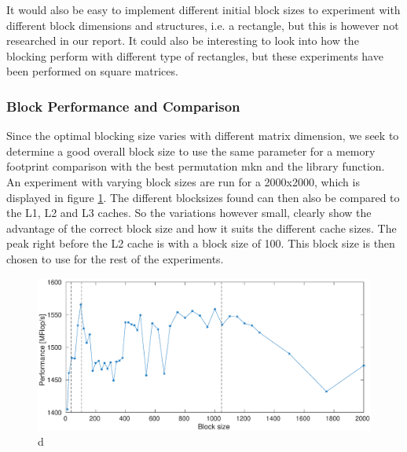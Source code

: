 It would also be easy to implement different initial block sizes to experiment with different block dimensions and structures, i.e. a rectangle, but this is however not researched in our report. It could also be interesting to look into how the blocking perform with different type of rectangles, but these experiments have been performed on square matrices.


\subsubsection{Block Performance and Comparison}

Since the optimal blocking size varies with different matrix dimension, we seek to determine a good overall block size to use the same parameter for a memory footprint comparison with the best permutation mkn and the library function.\\
An experiment with varying block sizes are run for a 2000x2000, which is displayed in figure \ref{fig:optblock}. The different blocksizes found can then also be compared to the L1, L2 and L3 caches. So the variations however small, clearly show the advantage of the correct block size and how it suits the different cache sizes. The peak right before the L2 cache is with a block size of 100. This block size is then chosen to use for the rest of the experiments.

\begin{figure}[h!] 
	\begin{center}
		\includegraphics[width=1.1 \textwidth]{fig/optimalBlock.eps} 
		\caption{d}
		\label{fig:optblock}
	\end{center}
\end{figure}

